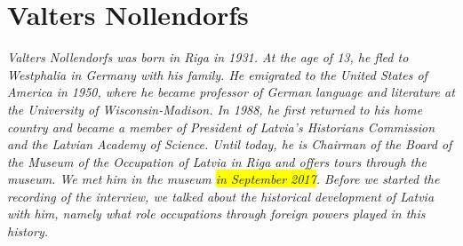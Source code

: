 \section{Valters Nollendorfs}

\textit{Valters Nollendorfs was born in Riga in 1931. At the age of 13, he fled to Westphalia in Germany with his family. He emigrated to the United States of America in 1950, where he became professor of German language and literature at the University of Wisconsin-Madison. In 1988, he first returned to his home country and became a member of President of Latvia's Historians Commission and the Latvian Academy of Science. Until today, he is Chairman of the Board of the Museum of the Occupation of Latvia in Riga and offers tours through the museum. We met him in the museum \colorbox{yellow}{in September 2017}. Before we started the recording of the interview, we talked about the historical development of Latvia with him, namely what role occupations through foreign powers played in this history.}\par
\vspace*{2em}
